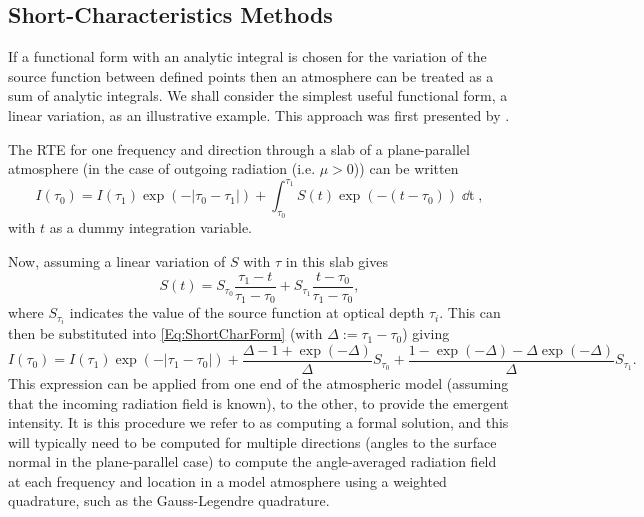 \subsection{Short-Characteristics Methods}\label{Sec:ShortChar}

If a functional form with an analytic integral is chosen for the variation of the source function between defined points then an atmosphere can be treated as a sum of analytic integrals. We shall consider the simplest useful functional form, a linear variation, as an illustrative example.
This approach was first presented by \citet{Olson1987}.

The RTE for one frequency and direction through a slab of a plane-parallel atmosphere (in the case of outgoing radiation (i.e. $\mu > 0$)) can be written
\begin{equation}
    I(\tau_0) = I(\tau_1) \exp(- |\tau_0 - \tau_1|) + \int_{\tau_0}^{\tau_1} S(t) \exp(-(t - \tau_0)) \mathop{\dd{}t},
    \label{Eq:ShortCharForm}
\end{equation}
with $t$ as a dummy integration variable.

Now, assuming a linear variation of $S$ with $\tau$ in this slab gives
\begin{equation}
    S(t) = S_{\tau_0} \frac{\tau_1-t}{\tau_1-\tau_0} + S_{\tau_1} \frac{t-\tau_0}{\tau_1-\tau_0},
\end{equation}
where $S_{\tau_i}$ indicates the value of the source function at optical depth $\tau_i$.
This can then be substituted into \eqref{Eq:ShortCharForm} (with $\Delta := \tau_1 - \tau_0$) giving
\begin{equation}
    I(\tau_0) = I(\tau_1) \exp(- |\tau_1 - \tau_0|) +
    \frac{\Delta - 1 + \exp(-\Delta)}{\Delta} S_{\tau_0} +
    \frac{1 - \exp(-\Delta) - \Delta\exp(-\Delta)}{\Delta} S_{\tau_1}.
\end{equation}
This expression can be applied  from one end of the atmospheric model (assuming that the incoming radiation field is known), to the other, to provide the emergent intensity.
It is this procedure we refer to as computing a formal solution, and this will typically need to be computed for multiple directions (angles to the surface normal in the plane-parallel case) to compute the angle-averaged radiation field at each frequency and location in a model atmosphere using a weighted quadrature, such as the Gauss-Legendre quadrature.

